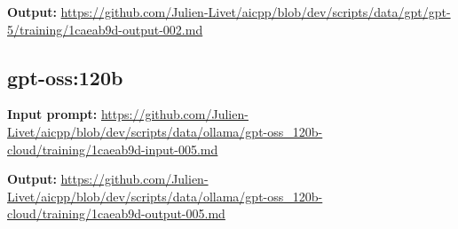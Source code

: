 \documentclass[final]{nesy2027}
\begin{document}
\textbf{Output:} \url{https://github.com/Julien-Livet/aicpp/blob/dev/scripts/data/gpt/gpt-5/training/1caeab9d-output-002.md}

\subsection{gpt-oss:120b}
\label{apd:gpt-oss}

\textbf{Input prompt:} \url{https://github.com/Julien-Livet/aicpp/blob/dev/scripts/data/ollama/gpt-oss_120b-cloud/training/1caeab9d-input-005.md}

\textbf{Output:} \url{https://github.com/Julien-Livet/aicpp/blob/dev/scripts/data/ollama/gpt-oss_120b-cloud/training/1caeab9d-output-005.md}
\end{document}

